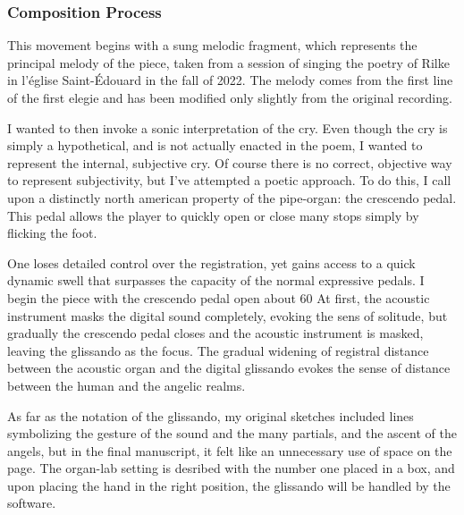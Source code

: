 \documentclass[12pt,twoside,maitrise]{dms}
\theoremstyle{definition}
\begin{document}
\subsubsection{Composition Process}

This movement begins with a sung melodic fragment, which represents the principal melody of the piece, taken from a session of singing the poetry of Rilke in l'église Saint-Édouard in the fall of 2022.
The melody comes from the first line of the first elegie and has been modified only slightly from the original recording. 


I wanted to then invoke a sonic interpretation of the cry.
Even though the cry is simply a hypothetical, and is not actually enacted in the poem, I wanted to represent the internal, subjective cry.
Of course there is no correct, objective way to represent subjectivity, but I've attempted a poetic approach.
To do this, I call upon a distinctly north american property of the pipe-organ: the crescendo pedal.
This pedal allows the player to quickly open or close many stops simply by flicking the foot.

One loses detailed control over the registration, yet gains access to a quick dynamic swell that surpasses the capacity of the normal expressive pedals.
I begin the piece with the crescendo pedal open about 60%
At first, the acoustic instrument masks the digital sound completely, evoking the sens of solitude, but gradually the crescendo pedal closes and the acoustic instrument is masked, leaving the glissando as the focus.
The gradual widening of registral distance between the acoustic organ and the digital glissando evokes the sense of distance between the human and the angelic realms.

As far as the notation of the glissando, my original sketches included lines symbolizing the gesture of the sound and the many partials, and the ascent of the angels, but in the final manuscript, it felt like an unnecessary use of space on the page.
The organ-lab setting is desribed with the number one placed in a box, and upon placing the hand in the right position, the glissando will be handled by the software.

\end{document}
